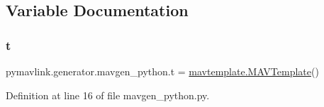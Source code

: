 \subsection{Variable Documentation}
\mbox{\label{namespacepymavlink_1_1generator_1_1mavgen__python_afbc8a434637253009d3198fbb4f64b77}} 
\subsubsection{\texorpdfstring{t}{t}}
{\footnotesize\ttfamily pymavlink.\+generator.\+mavgen\+\_\+python.\+t = \mbox{\hyperlink{classpymavlink_1_1generator_1_1mavtemplate_1_1MAVTemplate}{mavtemplate.\+M\+A\+V\+Template}}()}



Definition at line 16 of file mavgen\+\_\+python.\+py.

